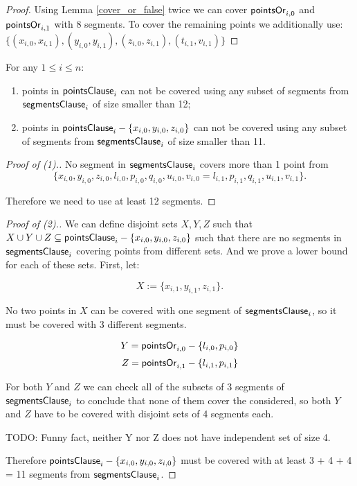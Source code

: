 \begin{proof}
Using Lemma \ref{cover_or_false} twice we can
cover $\mathsf{pointsOr}_{i,0}$ and  $\mathsf{pointsOr}_{i,1}$
with 8 segments.
To cover the remaining points we additionally use:
$\{ (x_{i, 0}, x_{i, 1}), (y_{i, 0}, y_{i, 1}),
(z_{i, 0}, z_{i, 1}), (t_{i, 1}, v_{i, 1}) \}$
\end{proof}

\begin{lemma}
\label{cover_clauses_segments_no_less}
For any $1 \le i \le n$:
\begin{enumerate}[label={(\arabic*)}]
	\item points in $\mathsf{pointsClause}_i$ can not be covered 
	using any subset of segments
	from $\mathsf{segmentsClause}_i$ of size smaller than 12;
	\item points in $\mathsf{pointsClause}_i - \{ x_{i, 0}, y_{i, 0}, z_{i, 0}\}$
	can not be covered using any subset of segments
	from $\mathsf{segmentsClause}_i$ of size smaller than 11.
\end{enumerate}
\end{lemma}


\begin{proof}[Proof of (1).]
No segment in $\mathsf{segmentsClause}_i$ covers more than 1 point from
$$\{ x_{i, 0}, y_{i, 0}, z_{i, 0}, l_{i, 0}, p_{i, 0}, q_{i, 0},
u_{i, 0}, v_{i, 0} = l_{i, 1}, p_{i, 1}, q_{i, 1}, u_{i, 1}, v_{i, 1} \}.$$

Therefore we need to use at least 12 segments.
\end{proof}

\begin{proof}[Proof of (2).]

We can define disjoint sets $X, Y, Z$ such that
$X \cup Y \cup Z \subseteq \mathsf{pointsClause}_i - \{x_{i, 0}, y_{i, 0}, z_{i, 0}\}$
such that there are no segments in $\mathsf{segmentsClause}_i$ covering points from different sets.
And we prove a lower bound for each of these sets.
First, let:

$$X := \{x_{i, 1}, y_{i, 1}, z_{i, 1}\}.$$

No two points in $X$ can be covered with one segment
of $\mathsf{segmentsClause}_i$, so it must be covered with 3 different segments.

$$Y = \mathsf{pointsOr}_{i,0} - \{l_{i, 0}, p_{i, 0}\}$$
$$Z = \mathsf{pointsOr}_{i,1} - \{l_{i, 1}, p_{i, 1}\}$$


For both $Y$ and $Z$ we can check all of the subsets of 3 segments
of $\mathsf{segmentsClause}_i$
to conclude that none of them cover the considered,
so both $Y$ and $Z$ have to be covered with 
disjoint sets of 4 segments each.

TODO: Funny fact, neither Y nor Z does not have independent set of size 4.

Therefore $\mathsf{pointsClause}_i - \{x_{i, 0}, y_{i, 0}, z_{i, 0}\}$
must be covered with at least 3 + 4 + 4 = 11 segments from $\mathsf{segmentsClause}_i$.
\end{proof}

